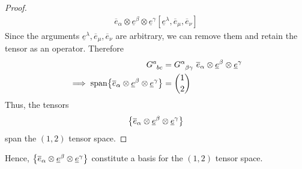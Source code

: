 \documentclass[12pt,a4paper]{article}
\newcommand{\und}[1]{\underline{#1}}
\newcommand{\ovr}[1]{\overline{#1}}
\begin{document}
\begin{solution_pset}
\begin{enumerate}[(1)]
\begin{proof}
\begin{align*}
						\ovr e_\alpha \otimes \und e^\beta \otimes \und e^\gamma
						[
							\und e^\lambda,
							\ovr e_\mu,
							\ovr e_\nu
						]
					\end{align*}
					Since the arguments $
						\und e^\lambda,
						\ovr e_\mu,
						\ovr e_\nu
					$ are arbitrary, we can remove them and retain
					the tensor as an operator. Therefore
					\begin{align*}
						G\indices{^a_{bc}} 
						&=
						G\indices{^\alpha_{\beta\gamma}}\ 
						\ovr e_\alpha \otimes \und e^\beta \otimes \und e^\gamma
						\\
						\implies
						\mathrm{span}\qty{
							\ovr e_\alpha \otimes \und e^\beta \otimes \und e^\gamma
						}
						&=
						\binom{1}{2}
					\end{align*}
					Thus, the tensors
					\[
						\qty{
							\ovr e_\alpha \otimes \und e^\beta \otimes \und e^\gamma
						}
					\]
					span the $(1,2)$ tensor space.
				\end{proof}
		\end{enumerate}
		Hence, $
		\qty{\ovr e_\alpha \otimes \und e^\beta \otimes \und e^\gamma}
		$ constitute a basis for the $(1,2)$ tensor space.

	\end{solution_pset}
	\newpage
\end{document}
